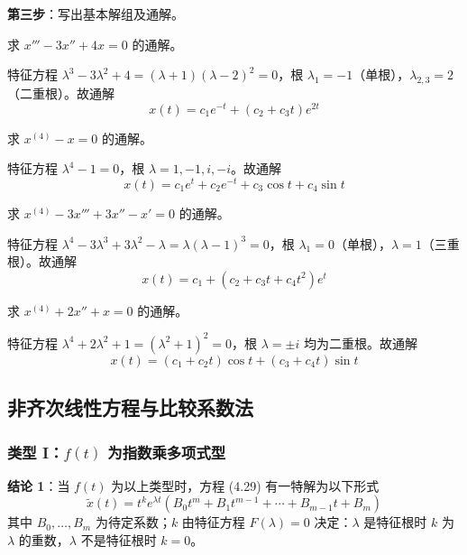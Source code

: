 \textbf{第三步}：写出基本解组及通解。

\begin{example}
求 $x''' - 3x'' + 4x = 0$ 的通解。
\end{example}

\begin{solution}
特征方程 $\lambda^3 - 3\lambda^2 + 4 = (\lambda + 1)(\lambda - 2)^2 = 0$，根 $\lambda_1 = -1$（单根），$\lambda_{2,3} = 2$（二重根）。故通解
$$x(t) = c_1e^{-t} + (c_2 + c_3t)e^{2t}$$
\end{solution}

\begin{example}
求 $x^{(4)} - x = 0$ 的通解。
\end{example}

\begin{solution}
特征方程 $\lambda^4 - 1 = 0$，根 $\lambda = 1, -1, i, -i$。故通解
$$x(t) = c_1e^t + c_2e^{-t} + c_3\cos t + c_4\sin t$$
\end{solution}

\begin{example}
求 $x^{(4)} - 3x''' + 3x'' - x' = 0$ 的通解。
\end{example}

\begin{solution}
特征方程 $\lambda^4 - 3\lambda^3 + 3\lambda^2 - \lambda = \lambda(\lambda - 1)^3 = 0$，根 $\lambda_1 = 0$（单根），$\lambda = 1$（三重根）。故通解
$$x(t) = c_1 + (c_2 + c_3t + c_4t^2)e^t$$
\end{solution}

\begin{example}
求 $x^{(4)} + 2x'' + x = 0$ 的通解。
\end{example}

\begin{solution}
特征方程 $\lambda^4 + 2\lambda^2 + 1 = (\lambda^2 + 1)^2 = 0$，根 $\lambda = \pm i$ 均为二重根。故通解
$$x(t) = (c_1 + c_2t)\cos t + (c_3 + c_4t)\sin t$$
\end{solution}

\subsection{非齐次线性方程与比较系数法}

\subsubsection{类型 I：$f(t)$ 为指数乘多项式型}

\textbf{结论 1}：当 $f(t)$ 为以上类型时，方程 (4.29) 有一特解为以下形式
$$\tilde{x}(t) = t^k e^{\lambda t}(B_0t^m + B_1t^{m-1} + \cdots + B_{m-1}t + B_m)$$
其中 $B_0, \ldots, B_m$ 为待定系数；$k$ 由特征方程 $F(\lambda) = 0$ 决定：$\lambda$ 是特征根时 $k$ 为 $\lambda$ 的重数，$\lambda$ 不是特征根时 $k = 0$。

